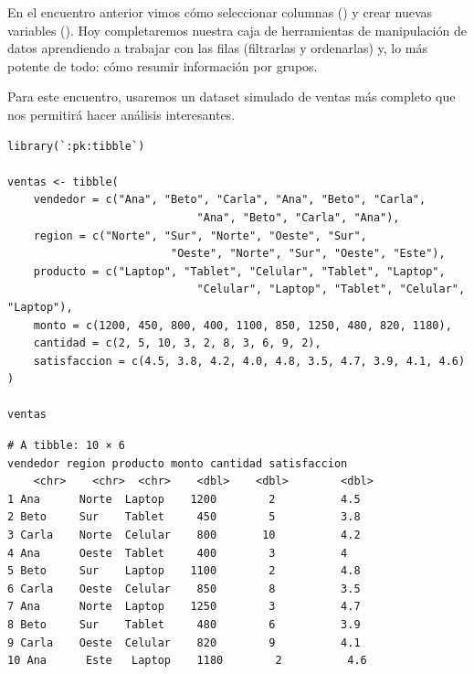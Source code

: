 \documentclass[8pt]{beamer}
\begin{document}
	\subtitle{5to encuentro: Manipulación de datos II}

	\begin{frame}[plain]
		\maketitle
	\end{frame}
	
	
	\begin{frame}[fragile]
		En el encuentro anterior vimos cómo seleccionar columnas () y crear nuevas variables (). Hoy completaremos nuestra caja de herramientas de manipulación de datos aprendiendo a trabajar con las filas (filtrarlas y ordenarlas) y, lo más potente de todo: cómo resumir información por grupos.
		
		Para este encuentro, usaremos un dataset simulado de ventas más completo que nos permitirá hacer análisis interesantes.
	\end{frame}
	
	
	
	\begin{frame}[fragile]
\begin{lstlisting}[style=RScript, numbers=none]
library(`:pk:tibble`)

ventas <- tibble(
	vendedor = c("Ana", "Beto", "Carla", "Ana", "Beto", "Carla",
							 "Ana", "Beto", "Carla", "Ana"),
	region = c("Norte", "Sur", "Norte", "Oeste", "Sur", 
						 "Oeste", "Norte", "Sur", "Oeste", "Este"),
	producto = c("Laptop", "Tablet", "Celular", "Tablet", "Laptop", 
							 "Celular", "Laptop", "Tablet", "Celular", "Laptop"),
	monto = c(1200, 450, 800, 400, 1100, 850, 1250, 480, 820, 1180),
	cantidad = c(2, 5, 10, 3, 2, 8, 3, 6, 9, 2),
	satisfaccion = c(4.5, 3.8, 4.2, 4.0, 4.8, 3.5, 4.7, 3.9, 4.1, 4.6)
)

ventas
\end{lstlisting}
\begin{lstlisting}[style=RConsole]
# A tibble: 10 × 6
vendedor region producto monto cantidad satisfaccion
	<chr>    <chr>  <chr>    <dbl>    <dbl>        <dbl>
1 Ana      Norte  Laptop    1200        2          4.5
2 Beto     Sur    Tablet     450        5          3.8
3 Carla    Norte  Celular    800       10          4.2
4 Ana      Oeste  Tablet     400        3          4  
5 Beto     Sur    Laptop    1100        2          4.8
6 Carla    Oeste  Celular    850        8          3.5
7 Ana      Norte  Laptop    1250        3          4.7
8 Beto     Sur    Tablet     480        6          3.9
9 Carla    Oeste  Celular    820        9          4.1
10 Ana      Este   Laptop    1180        2          4.6
\end{lstlisting}
	\end{frame}
	
\end{document}
